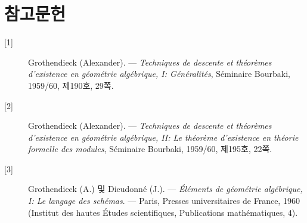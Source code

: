 \section*{참고문헌}

\begin{description}
\item[{[1]}] Grothendieck (Alexander). --- \emph{Techniques de descente et
théorèmes d'existence en géométrie algébrique, I: Généralités}, Séminaire
Bourbaki, 1959/60, 제190호, 29쪽.

\item[{[2]}] Grothendieck (Alexander). --- \emph{Techniques de descente et
théorèmes d'existence en géométrie algébrique, II: Le théorème d'existence en
théorie formelle des modules}, Séminaire Bourbaki, 1959/60, 제195호, 22쪽.

\item[{[3]}] Grothendieck (A.) 및 Dieudonné (J.). --- \emph{Éléments de
géométrie algébrique, I: Le langage des schémas}. --- Paris, Presses
universitaires de France, 1960 (Institut des hautes Études scientifiques,
Publications mathématiques, 4).
\end{description}


